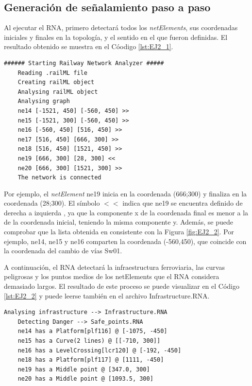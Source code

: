 \subsection{Generación de señalamiento paso a paso}

	Al ejecutar el RNA, primero detectará todos los \textit{netElements}, sus coordenadas iniciales y finales en la topología, y el sentido en el que fueron definidas. El resultado obtenido se muestra en el Cóodigo \ref{lst:EJ2_1}.
	
	\begin{lstlisting}[language = {}, caption = Detección de \textit{netElements} por parte del RNA , label = {lst:EJ2_1}]
	###### Starting Railway Network Analyzer #####
	Reading .railML file
	Creating railML object
	Analysing railML object
	Analysing graph
	ne14 [-1521, 450] [-560, 450] >>
	ne15 [-1521, 300] [-560, 450] >>
	ne16 [-560, 450] [516, 450] >>
	ne17 [516, 450] [666, 300] >>
	ne18 [516, 450] [1521, 450] >>
	ne19 [666, 300] [28, 300] <<
	ne20 [666, 300] [1521, 300] >>
	The network is connected
	\end{lstlisting}

	Por ejemplo, el \textit{netElement} ne19 inicia en la coordenada (666;300) y finaliza en la coordenada (28;300). El símbolo $<<$ indica que ne19 se encuentra definido de derecha a izquierda , ya que la componente x de la coordenada final es menor a la de la coordenada inicial, teniendo la misma componente y. Además, se puede comprobar que la lista obtenida en consistente con la Figura \ref{fig:EJ2_2}. Por ejemplo, ne14, ne15 y ne16 comparten la coordenada (-560,450), que coincide con la coordenada del cambio de vías Sw01.
	
	A continuación, el RNA detectará la infraestructura ferroviaria, las curvas peligrosas y los puntos medios de los netElements que el RNA considera demasiado largos. El resultado de este proceso se puede visualizar en el Código \ref{lst:EJ2_2} y puede leerse también en el archivo Infrastructure.RNA.
	
	\begin{lstlisting}[language = {}, caption = Detección de puntos críticos por parte del RNA , label = {lst:EJ2_2}]
	Analysing infrastructure --> Infrastructure.RNA
	Detecting Danger --> Safe_points.RNA
	ne14 has a Platform[plf116] @ [-1075, -450]
	ne15 has a Curve(2 lines) @ [[-710, 300]]
	ne16 has a LevelCrossing[lcr120] @ [-192, -450]
	ne18 has a Platform[plf117] @ [1111, -450]
	ne19 has a Middle point @ [347.0, 300]
	ne20 has a Middle point @ [1093.5, 300]
	\end{lstlisting}

